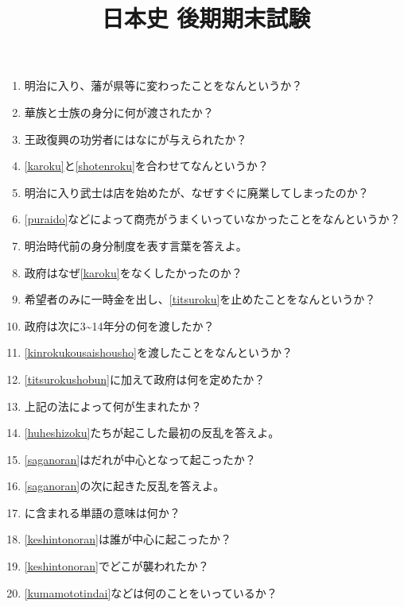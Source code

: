 \documentclass[]{jsarticle}
\begin{document}
\title{日本史 後期期末試験}

\author{}

\date{}

\maketitle

\renewcommand{\labelenumi}{(\arabic{enumi})}

\begin{enumerate}
	\item 明治に入り、藩が県等に変わったことをなんというか？
	\item 華族と士族の身分に何が渡されたか？\label{karoku}
	\item 王政復興の功労者にはなにが与えられたか？\label{shotenroku}
	\item \ref{karoku}と\ref{shotenroku}を合わせてなんというか？\label{titsuroku}
	\item 明治に入り武士は店を始めたが、なぜすぐに廃業してしまったのか？\label{puraido}
		\\
	\item \ref{puraido}などによって商売がうまくいっていなかったことをなんというか？
	\item 明治時代前の身分制度を表す言葉を答えよ。
	\item 政府はなぜ\ref{karoku}をなくしたかったのか？
	\item 希望者のみに一時金を出し、\ref{titsuroku}を止めたことをなんというか？
	\item 政府は次に3\textasciitilde14年分の何を渡したか？\label{kinrokukousaishousho}
	\item \ref{kinrokukousaishousho}を渡したことをなんというか？\label{titsurokushobun}
	\item \ref{titsurokushobun}に加えて政府は何を定めたか？
	\item 上記の法によって何が生まれたか？\label{huheshizoku}
	\item \ref{huheshizoku}たちが起こした最初の反乱を答えよ。\label{saganoran}
	\item \ref{saganoran}はだれが中心となって起こったか？
	\item \ref{saganoran}の次に起きた反乱を答えよ。\label{keshintonoran}
	\item \label{keshintonoran}に含まれる単語の意味は何か？
	\item \ref{keshintonoran}は誰が中心に起こったか？
	\item \ref{keshintonoran}でどこが襲われたか？\label{kumamototindai}
	\item \ref{kumamototindai}などは何のことをいっているか？

\end{enumerate}
\end{document}
